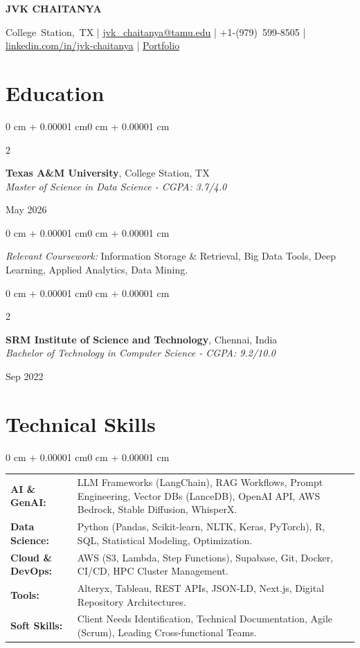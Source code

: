 \documentclass[letterpaper]{article}
\newenvironment{onecolentry}{
    \begin{adjustwidth}{0 cm + 0.00001 cm}{0 cm + 0.00001 cm}
}{
    \end{adjustwidth}
}
\newenvironment{twocolentry}[2][]{
    \onecolentry
    \def\secondColumn{#2}
    \setcolumnwidth{\fill, 4.5 cm}
    \begin{paracol}{2}
}{
    \switchcolumn \raggedleft \secondColumn
    \end{paracol} 
    \endonecolentry
}
\begin{document}
    \newcommand{\AND}{\unskip\enskip|\enskip\ignorespaces}

    \begin{center}
        \fontsize{22pt}{22pt}\selectfont \textbf{JVK CHAITANYA}

        \vspace{6pt}

        \small
        \mbox{College Station, TX} \AND
        \mbox{\href{mailto:jvk_chaitanya@tamu.edu}{jvk\_chaitanya@tamu.edu}} \AND
        \mbox{+1-(979) 599-8505} \AND
        \mbox{\href{https://linkedin.com/in/jvk-chaitanya}{linkedin.com/in/jvk-chaitanya}} \AND
        \mbox{\href{https://jvkchaitanya.github.io/portfolio/}{Portfolio}}
    \end{center}

    \section{Education}
    \begin{twocolentry}{May 2026}
        \textbf{Texas A\&M University}, College Station, TX \\
        \textit{Master of Science in Data Science - CGPA: 3.7/4.0}
    \end{twocolentry}
    \begin{onecolentry}
    \textit{Relevant Coursework:} Information Storage \& Retrieval, Big Data Tools, Deep Learning, Applied Analytics, Data Mining.
    \end{onecolentry}

    \vspace{0.1 cm}

    \begin{twocolentry}{Sep 2022}
        \textbf{SRM Institute of Science and Technology}, Chennai, India \\
        \textit{Bachelor of Technology in Computer Science - CGPA: 9.2/10.0}
    \end{twocolentry}

\section{Technical Skills}
\begin{onecolentry}
    \begin{tabularx}{\linewidth}{@{} >{\bfseries}l @{\hspace{1em}} X @{}}
    AI \& GenAI: & LLM Frameworks (LangChain), RAG Workflows, Prompt Engineering, Vector DBs (LanceDB), OpenAI API, AWS Bedrock, Stable Diffusion, WhisperX. \\
    Data Science: & Python (Pandas, Scikit-learn, NLTK, Keras, PyTorch), R, SQL, Statistical Modeling, Optimization. \\
    Cloud \& DevOps: & AWS (S3, Lambda, Step Functions), Supabase, Git, Docker, CI/CD, HPC Cluster Management. \\
    Tools: & Alteryx, Tableau, REST APIs, JSON-LD, Next.js, Digital Repository Architectures. \\
    Soft Skills: & Client Needs Identification, Technical Documentation, Agile (Scrum), Leading Cross-functional Teams.
    \end{tabularx}
\end{onecolentry}
\end{document}
